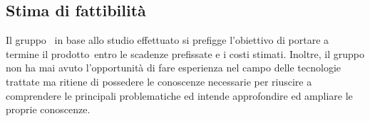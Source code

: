 \documentclass[../StudioDiFattibilita.tex]{subfiles}
\begin{document}
	\subsection{Stima di fattibilità}
	Il gruppo \leaf\ in base allo studio effettuato si prefigge l'obiettivo di portare a termine il prodotto\g\ entro le scadenze prefissate e i costi stimati.
	Inoltre, il gruppo non ha mai avuto l'opportunità di fare esperienza nel campo delle tecnologie trattate ma ritiene di possedere le conoscenze necessarie per riuscire a comprendere le principali problematiche ed intende approfondire ed ampliare le proprie conoscenze.
\end{document}
